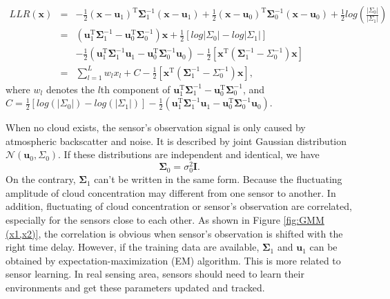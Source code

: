\begin{eqnarray}
LLR(\mathbf{x}) & = & -\frac{1}{2}\left(\mathbf{x}-\mathbf{u}_{1}\right)^{\mathrm{T}}\mathbf{\Sigma}_{1}^{-1}\left(\mathbf{x}-\mathbf{u}_{1}\right)+\frac{1}{2}\left(\mathbf{x}-\mathbf{u}_{0}\right)^{\mathrm{T}}\mathbf{\Sigma}_{0}^{-1}\left(\mathbf{x}-\mathbf{u}_{0}\right)+\frac{1}{2}log\left(\frac{\left|\Sigma_{0}\right|}{\left|\Sigma_{1}\right|}\right)\nonumber \\
 & = & \left(\mathbf{u}_{1}^{\mathrm{T}}\mathbf{\Sigma}_{1}^{-1}-\mathbf{u}_{0}^{\mathrm{T}}\mathbf{\Sigma}_{0}^{-1}\right)\mathbf{x}+\frac{1}{2}\left[log\left|\Sigma_{0}\right|-log\left|\Sigma_{1}\right|\right]\label{eq:G-LLR Expand}\\
 &  & -\frac{1}{2}\left(\mathbf{u}_{1}^{\mathrm{T}}\mathbf{\Sigma}_{1}^{-1}\mathbf{u}_{1}-\mathbf{u}_{0}^{\mathrm{T}}\mathbf{\Sigma}_{0}^{-1}\mathbf{u}_{0}\right)-\frac{1}{2}\left[\mathbf{x}^{\mathrm{T}}\left(\mathbf{\Sigma}_{1}^{-1}-\Sigma_{0}^{-1}\right)\mathbf{x}\right]\nonumber \\
 & = & \sum_{l=1}^{L}w_{l}x_{l}+C-\frac{1}{2}\left[\mathbf{x}^{\mathrm{T}}\left(\mathbf{\Sigma}_{1}^{-1}-\Sigma_{0}^{-1}\right)\mathbf{x}\right],\label{eq:G-LLR simple}
\end{eqnarray}
where $w_{l}$ denotes the $l\mbox{th}$ component of $\mathbf{u}_{1}^{\mathrm{T}}\mathbf{\Sigma}_{1}^{-1}-\mathbf{u}_{0}^{\mathrm{T}}\mathbf{\Sigma}_{0}^{-1}$,
and $C=\frac{1}{2}\left[log\left(\left|\Sigma_{0}\right|\right)-log(\left|\Sigma_{1}\right|)\right]-\frac{1}{2}\left(\mathbf{u}_{1}^{\mathrm{T}}\mathbf{\Sigma}_{1}^{-1}\mathbf{u}_{1}-\mathbf{u}_{0}^{\mathrm{T}}\mathbf{\Sigma}_{0}^{-1}\mathbf{u}_{0}\right)$. 

When no cloud exists, the sensor's observation signal is only caused
by atmospheric backscatter and noise. It is described by joint Gaussian
distribution $\mathcal{N}\left(\mathbf{u}_{0},\Sigma_{0}\right)$.
If these distributions are independent and identical, we have 
\begin{equation}
\mathbf{\Sigma}_{0}=\sigma_{0}^{2}\mathbf{I}.
\end{equation}
On the contrary, $\mathbf{\Sigma}_{1}$ can't be written in the same
form. Because the fluctuating amplitude of cloud concentration may
different from one sensor to another. In addition, fluctuating of
cloud concentration or sensor's observation are correlated, especially
for the sensors close to each other. As shown in Figure \ref{fig:GMM (x1,x2)},
the correlation is obvious when sensor's observation is shifted with
the right time delay. However, if the training data are available,
$\mathbf{\Sigma}_{1}$ and $\mathbf{u}_{1}$ can be obtained by expectation-maximization
(EM) algorithm. This is more related to sensor learning. In real sensing
area, sensors should need to learn their environments and get these
parameters updated and tracked. 

